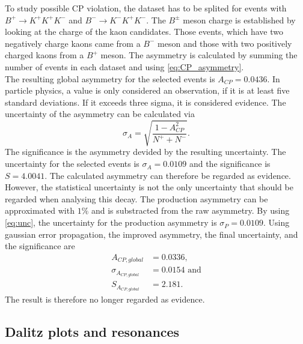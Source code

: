 To study possible CP violation, the dataset has to be splited for events with $B^+ \rightarrow K^+ K^+ K^-$ and $B^- \rightarrow K^- K^+ K^-$. The $B^{\pm}$ meson charge is established by 
looking at the charge of the kaon candidates. Those events, which have two negatively charge kaons came from a $B^-$ meson and those with two positively charged kaons from a $B^+$ meson.
The asymmetry is calculated by summing the number of events in each dataset and using \autoref{eq:CP_asymmetry}.\\
The resulting global asymmetry for the selected events is $A_{CP} = 0.0436$. In particle physics, a value is only considered an observation, if it is at least five standard deviations. If it exceeds
three sigma, it is considered evidence. The uncertainty of the asymmetry can be calculated via
\begin{equation}
  \label{eq:unc}
  \sigma_A = \sqrt{\frac{1-A_{CP}^2}{N^+ + N^-}}.
\end{equation}
The significance is the asymmetry devided by the resulting uncertainty. The uncertainty for the selected events is $\sigma_A = 0.0109$ and the significance is $S = 4.0041$. The calculated asymmetry can therefore be regarded 
as evidence.\\
However, the statistical uncertainty is not the only uncertainty that should be regarded when analysing this decay. The production asymmetry can be approximated with $1\%$ and is substracted from the raw asymmetry. By using \autoref{eq:unc}, the uncertainty
for the production asymmetry is $\sigma_P = 0.0109$. Using gaussian error propagation, the improved asymmetry, the final uncertainty, and the significance are
\begin{align*}
  A_{CP, global} &= 0.0336,\\
  \sigma_{A_{CP,global}} &=  0.0154\, \, \mathrm{and}\\
  S_{A_{CP,global}} &= 2.181.
\end{align*}
The result is therefore no longer regarded as evidence.

\subsection{Dalitz plots and resonances}

